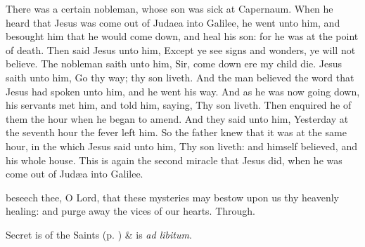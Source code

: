  There was a certain nobleman, whose son was sick at Capernaum. When he heard that Jesus was come out of Judaea into Galilee, he went unto him, and besought him that he would come down, and heal his son: for he was at the point of death. Then said Jesus unto him, Except ye see signs and wonders, ye will not believe. The nobleman saith unto him, Sir, come down ere my child die. Jesus saith unto him, Go thy way; thy son liveth. And the man believed the word that Jesus had spoken unto him, and he went his way. And as he was now going down, his servants met him, and told him, saying, Thy son liveth. Then enquired he of them the hour when he began to amend. And they said unto him, Yesterday at the seventh hour the fever left him. So the father knew that it was at the same hour, in the which Jesus said unto him, Thy son liveth: and himself believed, and his whole house. This is again the second miracle that Jesus did, when he was come out of Jud{\ae}a into Galilee.


\vspace{-2ex}

\secret
{} beseech thee, O Lord, that these mysteries may bestow upon us thy heavenly healing: and purge away the vices of our hearts. Through.

\vspace{0.25ex}

\begin{rubric}
     Secret is of the Saints (p. \pageref{SPSaints}) \&  is \emph{ad libitum}.
\end{rubric}

\vspace{-0.25ex}


\vspace{-0.25ex}


